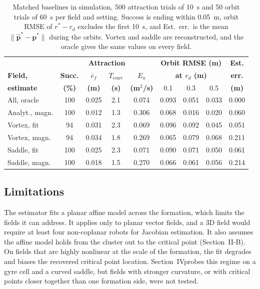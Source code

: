\documentclass[lettersize,journal]{IEEEtran}
\makeatletter
\newcommand{\rev}[1]{#1}                             %
\providecommand{\DIFdel}[1]{{\protect\color{DIFdeltx}\sout{#1}}} %
\providecommand{\DIFdelbegin}{\protect\color{DIFdeltx}} %
\providecommand{\DIFdelend}{\protect\color{black}} %
\providecommand{\DIFscaledelfig}{0.5} %
\newlength{\DIFdelgraphicswidth} %
\newlength{\DIFdelgraphicsheight} %
\providecommand{\DIFdelincludegraphics}[2][]{%
\sbox{\DIFdelgraphicsbox}{\DIFOincludegraphics[#1]{#2}}%
\settoboxwidth{\DIFdelgraphicswidth}{\DIFdelgraphicsbox} %
\settoboxtotalheight{\DIFdelgraphicsheight}{\DIFdelgraphicsbox} %
\scalebox{\DIFscaledelfig}{%
\parbox[b]{\DIFdelgraphicswidth}{\usebox{\DIFdelgraphicsbox}\\[-\baselineskip] \rule{\DIFdelgraphicswidth}{0em}}\llap{\resizebox{\DIFdelgraphicswidth}{\DIFdelgraphicsheight}{%
\setlength{\unitlength}{\DIFdelgraphicswidth}%
\begin{picture}(1,1)%
\thicklines\linethickness{2pt} %
{\color{DIFdeltx}\put(0,0){\framebox(1,1){}}}%
{\color{DIFdeltx}\put(0,0){\line( 1,1){1}}}%
{\color{DIFdeltx}\put(0,1){\line(1,-1){1}}}%
\end{picture}%
}\hspace*{3pt}}} %
} %
\DeclareRobustCommand{\DIFdelbegin}{\DIFOdelbegin \let\includegraphics\DIFdelincludegraphics} %
\DeclareRobustCommand{\DIFdelend}{\DIFOdelend \let\includegraphics\DIFOincludegraphics} %
\let\sout@orig\sout %
\renewcommand{\sout}[1]{\ifmmode\text{\sout@orig{\ensuremath{#1}}}\else\sout@orig{#1}\fi} %
\makeatother
\begin{document}
\begin{table}[!t]
\centering
\scriptsize
\caption{Matched baselines in simulation, \rev{500} attraction trials of 10~s and \rev{50} orbit trials of 60~s per field and setting. Success is ending within 0.05~m, orbit RMSE of $r^* - r_d$ excludes the first 10~s, and Est.\ err.\ is the mean $\|\hat{\mathbf{p}}^* - \mathbf{p}^*\|$ during the orbits. Vortex and saddle are reconstructed, and the oracle gives the same values on every field.} %
\label{tab:baselines}
\setlength{\tabcolsep}{2pt}
\rev{\begin{tabular}{lcccc|ccc|c}
\hline
 & \multicolumn{4}{c|}{\textbf{Attraction}} & \multicolumn{3}{c|}{\textbf{Orbit RMSE (m)}} & \textbf{Est.} \\
\textbf{Field,} & \textbf{Succ.} & \textbf{$\bar{e}_f$} & \textbf{$T_{\mathrm{conv}}$} & \textbf{$E_u$} & \multicolumn{3}{c|}{\textbf{at $r_d$ (m)}} & \textbf{err.} \\
\textbf{estimate} & \textbf{(\%)} & \textbf{(m)} & \textbf{(s)} & \textbf{(m$^2$/s)} & 0.1 & 0.3 & 0.5 & \textbf{(m)} \\
\hline
All, oracle & 100 & 0.025 & 2.1 & 0.074 & 0.093 & 0.051 & 0.033 & 0.000 \\
Analyt., magn. & 100 & 0.012 & 1.3 & 0.306 & 0.068 & 0.016 & 0.020 & 0.060 \\
Vortex, fit & 94 & 0.031 & 2.3 & 0.069 & 0.096 & 0.092 & 0.045 & 0.051 \\
Vortex, magn. & 94 & 0.034 & 1.8 & 0.269 & 0.065 & 0.079 & 0.068 & 0.211 \\
Saddle, fit & 100 & 0.025 & 2.3 & 0.071 & 0.090 & 0.071 & 0.050 & 0.061 \\
Saddle, magn. & 100 & 0.018 & 1.5 & 0.270 & 0.066 & 0.061 & 0.056 & 0.214 \\
\hline
\end{tabular}} %
\end{table}


\subsection{Limitations}

The estimator fits a planar affine model across the formation, which limits the fields it can address. It applies only to planar vector fields, and a 3D field would require at least four non-coplanar robots for Jacobian estimation. It also assumes the affine model holds from the cluster out to the critical point (Section~II-B). On fields that are highly nonlinear at the scale of the formation, the fit degrades and biases the recovered critical point location. Section~IV\DIFdelbegin \DIFdel{-D}\DIFdelend  probes this regime on a gyre cell and a curved saddle, but fields with stronger curvature, or with critical points closer together than one formation side, were not tested.
\end{document}
